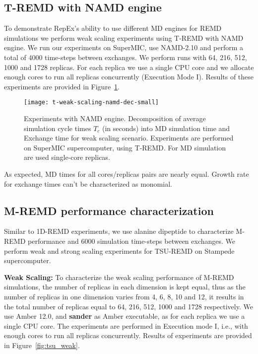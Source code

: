 \documentclass{sig-alternate-05-2015}
\begin{document}
\subsection{T-REMD with NAMD engine} \label{exp.namd.t-remd}

To demonstrate RepEx's ability to use different MD engines for REMD simulations we perform weak scaling experiments using T-REMD with NAMD engine. We run our experiments on SuperMIC, use NAMD-2.10 and perform a total of 4000 time-steps between exchanges. We perform runs with 64, 216, 512, 1000 and 1728 replicas. For each replica we use a single CPU core and we allocate enough cores to run all replicas concurrently (Execution Mode I). Results of these experiments are provided in Figure~\ref{fig:t-remd-namd}.

\begin{figure}[ht!]
\centering
\texttt{[image: t-weak-scaling-namd-dec-small]}
\caption{\small{Experiments with NAMD engine. Decomposition of average simulation cycle times $T_{c}$ (in seconds) into MD simulation time and Exchange time for weak scaling scenario. Experiments are performed on SuperMIC supercomputer, using T-REMD. For MD simulation are used single-core replicas.}}
\label{fig:t-remd-namd}
\end{figure}

As expected, MD times for all cores/replicas pairs are nearly equal. Growth rate for exchange times can't be characterized as monomial.

\subsection{M-REMD performance characterization}

Similar to 1D-REMD experiments, we use alanine dipeptide to characterize M-REMD performance and 6000 simulation time-steps between exchanges. We perform weak and strong scaling experiments for TSU-REMD on Stampede supercomputer.

{\bf Weak Scaling:} To characterize the weak scaling performance of M-REMD simulations, the number of replicas in each dimension is kept equal, thus as the number of replicas in one dimension varies from 4, 6, 8, 10 and 12, it results in the total number of replicas equal to 64, 216, 512, 1000 and 1728 respectively. We use Amber 12.0, and \textbf{sander} as Amber executable, as for each replica we use a single CPU core. The experiments are performed in Execution mode I, i.e., with enough cores to run all replicas concurrently.  Results of experiments are provided in Figure~\ref{fig:tsu_weak}.
\end{document}
